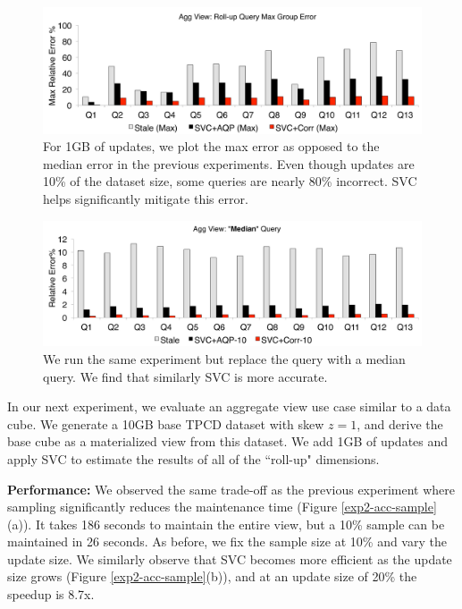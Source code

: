 \begin{figure}[t]
\centering
\includegraphics[scale=0.17]{exp/msdc_4.pdf}
   \caption{For 1GB of updates, we plot the max error as opposed to the median error in the previous experiments. Even though updates are 10\% of the dataset size, some queries are nearly 80\% incorrect. SVC helps significantly mitigate this error. \label{exp2-max}}
\end{figure}

\begin{figure}[t]
\centering
  \includegraphics[scale=0.17]{exp/msdc_5.pdf}
 \caption{We run the same experiment but replace the \sumfunc query with a median query. We find that similarly SVC is more accurate.\label{exp2-median} }
\end{figure}

In our next experiment, we evaluate an aggregate view use case similar to a data cube.
We generate a 10GB base TPCD dataset with skew $z=1$, and derive the base cube as a materialized view from this dataset.
We add 1GB of updates and apply SVC to estimate the results of all of the ``roll-up" dimensions.

\textbf{Performance: }
We observed the same trade-off as the previous experiment where sampling significantly reduces the maintenance time (Figure \ref{exp2-acc-sample}(a)).
It takes 186 seconds to maintain the entire view, but a 10\% sample can be maintained in 26 seconds.
As before, we fix the sample size at 10\% and vary the update size.
We similarly observe that SVC becomes more efficient as the update size grows (Figure \ref{exp2-acc-sample}(b)), and at an update size of 20\%  the speedup is 8.7x.

